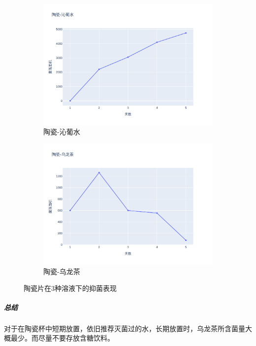 \documentclass[12pt,a4paper]{ctexart}
\begin{document}
\begin{figure}[htbp]
\begin{subfigure}[b]{0.31\textwidth}
        \includegraphics[width=\linewidth]{./plot/SingleMaterial/china/陶瓷-沁葡水_line.png}
        \caption{陶瓷-沁葡水}
        \label{subfig:2}
    \end{subfigure}
    \hfill  %
    \begin{subfigure}[b]{0.31\textwidth}
        \centering
        \includegraphics[width=\linewidth]{./plot/SingleMaterial/china/陶瓷-乌龙茶_line.png}
        \caption{陶瓷-乌龙茶}
        \label{subfig:3}
    \end{subfigure}
    \caption{陶瓷片在3种溶液下的抑菌表现}
    \label{fig:triple_horizontal}  %
\end{figure}

\subparagraph{总结}
对于在陶瓷杯中短期放置，依旧推荐灭菌过的水，长期放置时，乌龙茶所含菌量大概最少。而尽量不要存放含糖饮料。
\end{document}
